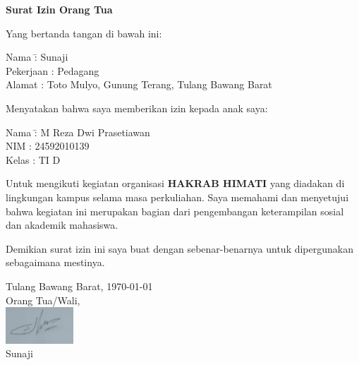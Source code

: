 \documentclass[a4paper,12pt]{article}
\begin{document}
\begin{center}
    \Large\textbf{Surat Izin Orang Tua}
\end{center}

\vspace{0.5cm}

\noindent
Yang bertanda tangan di bawah ini:

\vspace{0.2cm}

\begin{tabbing}
    Nama \hspace{2.2cm} \= : Sunaji \\
    Pekerjaan \> : Pedagang \\
    Alamat \> : Toto Mulyo, Gunung  Terang, Tulang Bawang Barat
\end{tabbing}

\vspace{0.5cm}

\noindent
Menyatakan bahwa saya memberikan izin kepada anak saya:

\vspace{0.2cm}

\begin{tabbing}
    Nama \hspace{2.2cm} \= : M Reza Dwi Prasetiawan\\
    NIM \> : 24592010139 \\
    Kelas \> : TI D
\end{tabbing}

\vspace{0.5cm}

\noindent
Untuk mengikuti kegiatan organisasi \textbf{HAKRAB HIMATI} yang diadakan di lingkungan kampus selama masa perkuliahan. Saya memahami dan menyetujui bahwa kegiatan ini merupakan bagian dari pengembangan keterampilan sosial dan akademik mahasiswa.

\vspace{0.5cm}

\noindent
Demikian surat izin ini saya buat dengan sebenar-benarnya untuk dipergunakan sebagaimana mestinya.

\vspace{1cm}

\begin{flushright}
    Tulang Bawang Barat, \today\\
    Orang Tua/Wali, \\
    \includegraphics[width=1in]{resources/parent_sign.jpg}\\
    Sunaji
\end{flushright}
\end{document}
